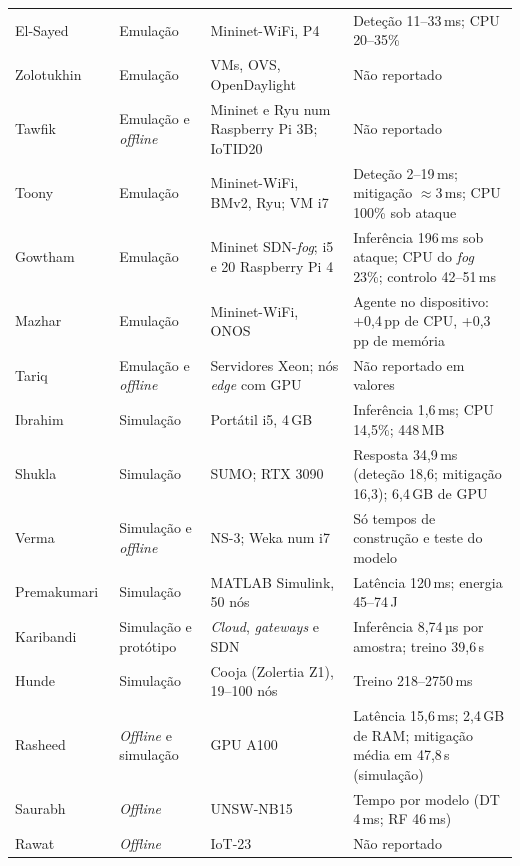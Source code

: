 \documentclass[conference,a4paper]{IEEEtran}
\begin{document}
\begin{table}[p]
\begin{tabular}{@{}>{\raggedright\arraybackslash}p{}>{\raggedright\arraybackslash}p{}>{\raggedright\arraybackslash}p{}>{\raggedright\arraybackslash}p{}@{}}
El-Sayed~\cite{elsayed2024mpguard} & Emulação & Mininet-WiFi, P4 & Deteção 11--33\,ms; CPU 20--35\% \\
Zolotukhin~\cite{zolotukhin2021curious} & Emulação & VMs, OVS, OpenDaylight & Não reportado \\
Tawfik~\cite{tawfik2021internet} & Emulação e \textit{offline} & Mininet e Ryu num Raspberry Pi 3B; IoTID20 & Não reportado \\
Toony~\cite{toony2024multiblock} & Emulação & Mininet-WiFi, BMv2, Ryu; VM i7 & Deteção 2--19\,ms; mitigação $\approx$3\,ms; CPU 100\% sob ataque \\
Gowtham~\cite{gowtham2026fedmp} & Emulação & Mininet SDN-\textit{fog}; i5 e 20 Raspberry Pi 4 & Inferência 196\,ms sob ataque; CPU do \textit{fog} 23\%; controlo 42--51\,ms \\
Mazhar~\cite{mazhar2022ridps} & Emulação & Mininet-WiFi, ONOS & Agente no dispositivo: +0,4\,pp de CPU, +0,3\,pp de memória \\
Tariq~\cite{tariq2025saegru} & Emulação e \textit{offline} & Servidores Xeon; nós \textit{edge} com GPU & Não reportado em valores \\
Ibrahim~\cite{ibrahim2026purechain} & Simulação & Portátil i5, 4\,GB & Inferência 1,6\,ms; CPU 14,5\%; 448\,MB \\
Shukla~\cite{shukla2026cyber} & Simulação & SUMO; RTX 3090 & Resposta 34,9\,ms (deteção 18,6; mitigação 16,3); 6,4\,GB de GPU \\
Verma~\cite{verma2024petrak} & Simulação e \textit{offline} & NS-3; Weka num i7 & Só tempos de construção e teste do modelo \\
Premakumari~\cite{premakumari2025qlearning} & Simulação & MATLAB Simulink, 50 nós & Latência 120\,ms; energia 45--74\,J \\
Karibandi~\cite{karibandi2025cyberdome} & Simulação e protótipo & \textit{Cloud}, \textit{gateways} e SDN & Inferência 8,74\,µs por amostra; treino 39,6\,s \\
Hunde~\cite{hunde2026rankshield} & Simulação & Cooja (Zolertia Z1), 19--100 nós & Treino 218--2750\,ms \\
Rasheed~\cite{Rasheed2026} & \textit{Offline} e simulação & GPU A100 & Latência 15,6\,ms; 2,4\,GB de RAM; mitigação média em 47,8\,s (simulação) \\
Saurabh~\cite{saurabh2022mlaps} & \textit{Offline} & UNSW-NB15 & Tempo por modelo (DT 4\,ms; RF 46\,ms) \\
Rawat~\cite{rawat2024intelligent} & \textit{Offline} & IoT-23 & Não reportado \\

\end{tabular}
\end{table}
\end{document}
